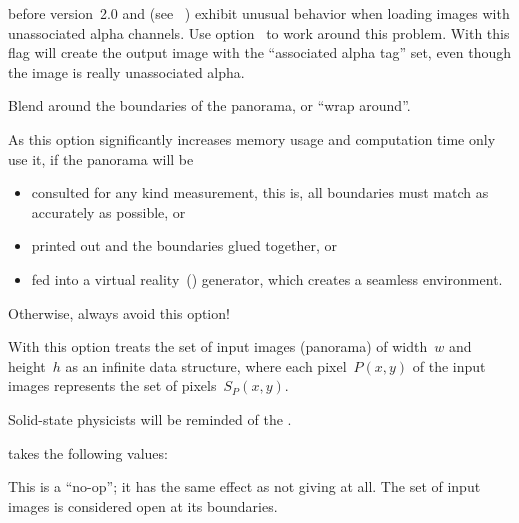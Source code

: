 \begin{codelist}
   before version~2.0 and  (see
  \appendixName~) exhibit unusual behavior when loading images
  with unassociated alpha channels.  Use option~ to work around this problem.  With
  this flag \App{} will create the output image with the ``associated alpha tag'' set, even
  though the image is really unassociated alpha.


  \label{opt:wrap}%
\item[\itempar{-w \optional{\metavar{MODE}} \\ --wrap\optional{=\metavar{MODE}}}]\itemend
  Blend around the boundaries of the panorama, or ``wrap around''.

  As this option significantly increases memory usage and computation time only use it, if the
  panorama will be

  \begin{itemize}
  \item
    consulted for any kind measurement, this is, all boundaries must match as accurately as
    possible, or

  \item
    printed out and the boundaries glued together, or

  \item
    fed into a virtual reality~() generator, which creates a seamless environment.
  \end{itemize}

  \noindent Otherwise, always avoid this option!

  With this option \App{} treats the set of input images (panorama) of width~$w$ and height~$h$
  as an infinite data structure, where each pixel~$P(x, y)$ of the input images represents the
  set of pixels~$S_P(x, y)$.

  \begin{geeknote}
    Solid-state physicists will be reminded of the
    .
  \end{geeknote}

   takes the following values:

  \begin{codelist}
  \item[\itempar{none \\ open}]\itemend
    This is a ``no-op''; it has the same effect as not giving  at all.  The set
    of input images is considered open at its boundaries.


\end{codelist}
\end{codelist}
